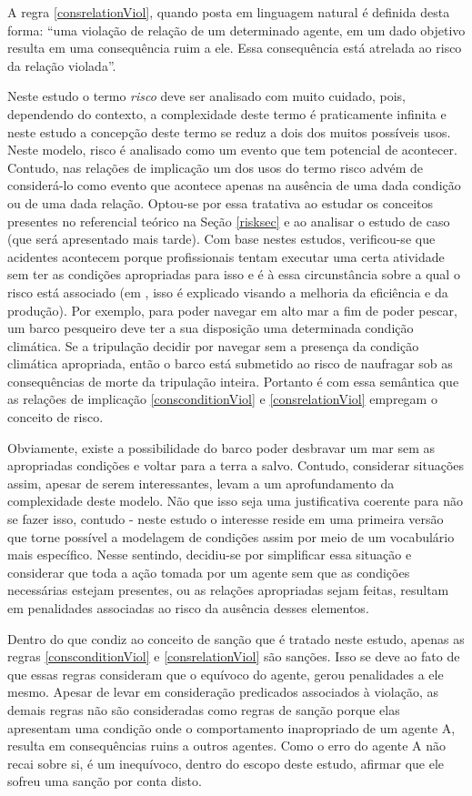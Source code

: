 A regra \ref{consrelationViol}, quando posta em linguagem natural é definida desta forma: ``uma violação de relação de um determinado agente, em um dado objetivo resulta em uma consequência ruim a ele. Essa consequência está atrelada ao risco da relação violada''. 

Neste estudo o termo \textit{risco} deve ser analisado com muito cuidado, pois, dependendo do contexto, a complexidade deste termo é praticamente infinita e neste estudo a concepção deste termo se reduz a dois dos muitos possíveis usos. Neste modelo, risco é analisado como um evento que tem potencial de acontecer. Contudo, nas relações de implicação um dos usos do termo risco advém de considerá-lo como evento que acontece apenas na ausência de uma dada condição ou de uma dada relação. Optou-se por essa tratativa ao estudar os conceitos presentes no referencial teórico na Seção \ref{risksec} e ao analisar o estudo de caso (que será apresentado mais tarde). Com base nestes estudos, verificou-se que acidentes acontecem porque profissionais tentam executar uma certa atividade sem ter as condições apropriadas para isso e é à essa circunstância sobre a qual o risco está associado (em \cite{safety}, isso é explicado visando a melhoria da eficiência e da produção). Por exemplo, para poder navegar em alto mar a fim de poder pescar, um barco pesqueiro deve ter a sua disposição uma determinada condição climática. Se a tripulação decidir por navegar sem a presença da condição climática apropriada, então o barco está submetido ao risco de naufragar sob as consequências de morte da tripulação inteira. Portanto é com essa semântica que as relações de implicação \ref{consconditionViol} e \ref{consrelationViol} empregam o conceito de risco. 

Obviamente, existe a possibilidade do barco poder desbravar um mar sem as apropriadas condições e voltar para a terra a salvo. Contudo, considerar situações assim, apesar de serem interessantes, levam a um aprofundamento da complexidade deste modelo. Não que isso seja uma justificativa coerente para não se fazer isso, contudo - neste estudo o interesse reside em uma primeira versão que torne possível a modelagem de condições assim por meio de um vocabulário mais específico. Nesse sentindo, decidiu-se por simplificar essa situação e considerar que toda a ação tomada por um agente sem que as condições necessárias estejam presentes, ou as relações apropriadas sejam feitas, resultam em penalidades associadas ao risco da ausência desses elementos.  

Dentro do que condiz ao conceito de sanção que é tratado neste estudo, apenas as regras \ref{consconditionViol} e \ref{consrelationViol} são sanções. Isso se deve ao fato de que essas regras consideram que o equívoco do agente, gerou penalidades a ele mesmo. Apesar de levar em consideração predicados associados à violação, as demais regras não são consideradas como regras de sanção porque elas apresentam uma condição onde o comportamento inapropriado de um agente A, resulta em consequências ruins a outros agentes. Como o erro do agente A não recai sobre si, é um inequívoco, dentro do escopo deste estudo, afirmar que ele sofreu uma sanção por conta disto. 


